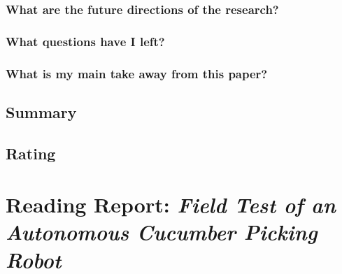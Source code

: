 \documentclass{article}
\begin{document}
\subsubsection*{What are the future directions of the research?}
\subsubsection*{What questions have I left?}
\subsubsection*{What is my main take away from this paper?}

\subsection*{Summary}

\subsection*{Rating}

\section{Reading Report: \emph{Field Test of an Autonomous Cucumber Picking Robot
}}
\cite{Henten2003}
\end{document}
